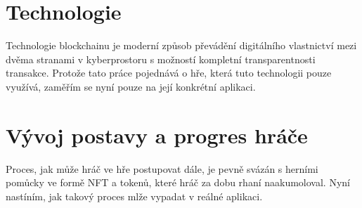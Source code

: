 \documentclass{article}
\begin{document}
\begin{spacing}{1.15}
        \section*{Technologie}
        Technologie blockchainu je moderní způsob převádění digitálního
        vlastnictví mezi dvěma stranami v kyberprostoru s možností kompletní
        transparentnosti transakce. Protože tato práce pojednává o hře, která
        tuto technologii pouze využívá, zaměřím se nyní pouze na její konkrétní
        aplikaci. 

        \section*{Vývoj postavy a progres hráče}
        Proces, jak může hráč ve hře postupovat dále, je pevně svázán s herními
        pomůcky ve formě NFT a tokenů, které hráč za dobu rhaní naakumoloval.
        Nyní nastíním, jak takový proces mlže vypadat v reálné aplikaci.

	\end{spacing}
\end{document}
